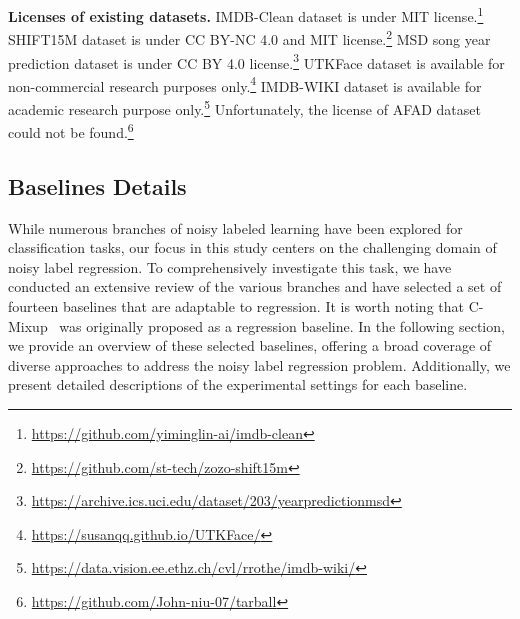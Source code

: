 \documentclass{article}
\theoremstyle{plain}
\theoremstyle{definition}
\theoremstyle{remark}
\begin{document}
\textbf{Licenses of existing datasets. }
IMDB-Clean dataset \citep{lin2021imdbclean} is under MIT license.\footnote{\url{https://github.com/yiminglin-ai/imdb-clean}}
SHIFT15M dataset \citep{kimura21shift15m} is under CC BY-NC 4.0 and MIT license.\footnote{\url{https://github.com/st-tech/zozo-shift15m}}
MSD \citep{bertin11msd} song year prediction dataset is under CC BY 4.0 license.\footnote{\url{https://archive.ics.uci.edu/dataset/203/yearpredictionmsd}}
UTKFace dataset \citep{zhifei2017utkface} is available for non-commercial research purposes only.\footnote{\url{https://susanqq.github.io/UTKFace/}}
IMDB-WIKI dataset \citep{rothe2015imdb-wiki,rothe18imdb} is available for academic research purpose only.\footnote{\url{https://data.vision.ee.ethz.ch/cvl/rrothe/imdb-wiki/}}
Unfortunately, the license of AFAD \citep{niu16afad} dataset could not be found.\footnote{\url{https://github.com/John-niu-07/tarball}}

\subsection{Baselines Details}\label{subsec:baselines}
While numerous branches of noisy labeled learning have been explored for classification tasks, our focus in this study centers on the challenging domain of noisy label regression. 
To comprehensively investigate this task, we have conducted an extensive review of the various branches and have selected a set of fourteen baselines that are adaptable to regression. 
It is worth noting that C-Mixup~\citep{yao22cmixup} was originally proposed as a regression baseline.
In the following section, we provide an overview of these selected baselines, offering a broad coverage of diverse approaches to address the noisy label regression problem. 
Additionally, we present detailed descriptions of the experimental settings for each baseline.
\end{document}
